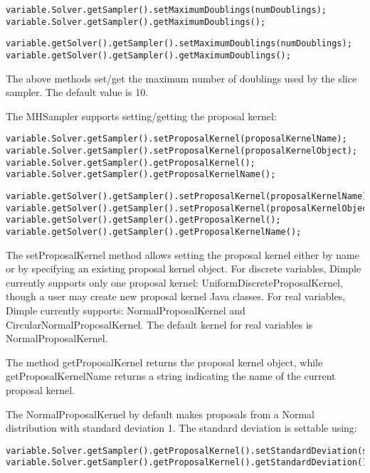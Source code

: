 \ifmatlab
\begin{lstlisting}
variable.Solver.getSampler().setMaximumDoublings(numDoublings);
variable.Solver.getSampler().getMaximumDoublings();
\end{lstlisting}
\fi

\ifjava
\begin{lstlisting}
variable.getSolver().getSampler().setMaximumDoublings(numDoublings);
variable.getSolver().getSampler().getMaximumDoublings();
\end{lstlisting}
\fi

The above methods set/get the maximum number of doublings used by the slice sampler.  The default value is 10.

The MHSampler supports setting/getting the proposal kernel:

\ifmatlab
\begin{lstlisting}
variable.Solver.getSampler().setProposalKernel(proposalKernelName);
variable.Solver.getSampler().setProposalKernel(proposalKernelObject);
variable.Solver.getSampler().getProposalKernel();
variable.Solver.getSampler().getProposalKernelName();
\end{lstlisting}
\fi

\ifjava
\begin{lstlisting}
variable.getSolver().getSampler().setProposalKernel(proposalKernelName);
variable.getSolver().getSampler().setProposalKernel(proposalKernelObject);
variable.getSolver().getSampler().getProposalKernel();
variable.getSolver().getSampler().getProposalKernelName();
\end{lstlisting}
\fi

The setProposalKernel method allows setting the proposal kernel either by name or by specifying an existing proposal kernel object.  For discrete variables, Dimple currently supports only one proposal kernel: UniformDiscreteProposalKernel, though a user may create new proposal kernel Java classes.  For real variables, Dimple currently supports: NormalProposalKernel and CircularNormalProposalKernel.  The default kernel for real variables is NormalProposalKernel.

The method getProposalKernel returns the proposal kernel object, while getProposalKernelName returns a string indicating the name of the current proposal kernel.

The NormalProposalKernel by default makes proposals from a Normal distribution with standard deviation 1.  The standard deviation is settable using:

\ifmatlab
\begin{lstlisting}
variable.Solver.getSampler().getProposalKernel().setStandardDeviation(std);
variable.Solver.getSampler().getProposalKernel().getStandardDeviation();
\end{lstlisting}
\fi

